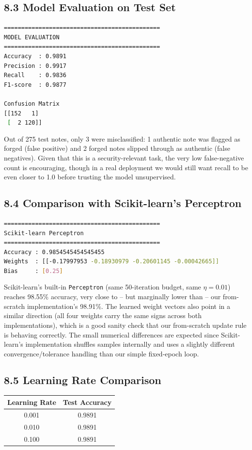 \documentclass[11pt]{article}
\begin{document}
\subsection*{8.3 Model Evaluation on Test Set}
\begin{lstlisting}[language=bash, basicstyle=\ttfamily\scriptsize, frame=single, backgroundcolor=\color{codebg}]
=============================================
MODEL EVALUATION
=============================================
Accuracy  : 0.9891
Precision : 0.9917
Recall    : 0.9836
F1-score  : 0.9877

Confusion Matrix
[[152   1]
 [  2 120]]
\end{lstlisting}

Out of 275 test notes, only 3 were misclassified: 1 authentic note was flagged as forged (false positive) and 2 forged notes slipped through as authentic (false negatives). Given that this is a security-relevant task, the very low false-negative count is encouraging, though in a real deployment we would still want recall to be even closer to 1.0 before trusting the model unsupervised.

\subsection*{8.4 Comparison with Scikit-learn's Perceptron}
\begin{lstlisting}[language=bash, basicstyle=\ttfamily\scriptsize, frame=single, backgroundcolor=\color{codebg}]
=============================================
Scikit-learn Perceptron
=============================================
Accuracy : 0.9854545454545455
Weights  : [[-0.17997953 -0.18930979 -0.20601145 -0.00042665]]
Bias     : [0.25]
\end{lstlisting}

Scikit-learn's built-in \texttt{Perceptron} (same 50-iteration budget, same $\eta=0.01$) reaches 98.55\% accuracy, very close to -- but marginally lower than -- our from-scratch implementation's 98.91\%. The learned weight vectors also point in a similar direction (all four weights carry the same signs across both implementations), which is a good sanity check that our from-scratch update rule is behaving correctly. The small numerical differences are expected since Scikit-learn's implementation shuffles samples internally and uses a slightly different convergence/tolerance handling than our simple fixed-epoch loop.

\subsection*{8.5 Learning Rate Comparison}
\begin{center}
\begin{tabular}{|c|c|}
\hline
\textbf{Learning Rate} & \textbf{Test Accuracy}\\
\hline
0.001 & 0.9891\\
\hline
0.010 & 0.9891\\
\hline
0.100 & 0.9891\\
\hline
\end{tabular}
\end{center}
\end{document}
